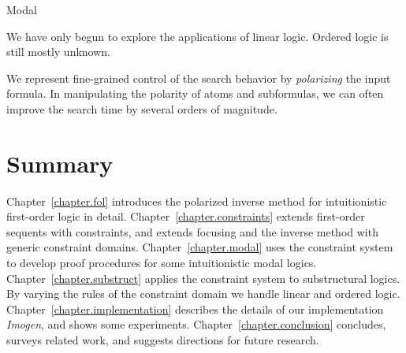 Modal

We have only begun to explore the applications of linear logic.  Ordered
logic is still mostly unknown.


We represent fine-grained control of the search behavior
by \emph{polarizing} the input formula.
In manipulating the polarity of atoms and subformulas, we can
often improve the search time by several orders of magnitude.


\section{Summary}

Chapter~\ref{chapter.fol} introduces the polarized inverse method for
intuitionistic first-order logic in detail.  Chapter~\ref{chapter.constraints}
extends first-order sequents with constraints, and extends focusing and
the inverse method with generic constraint domains.  Chapter~\ref{chapter.modal}
uses the constraint system to develop proof procedures for some intuitionistic
modal logics.  Chapter~\ref{chapter.substruct} applies the constraint system
to substructural logics.  By varying the rules of the constraint domain we
handle linear and ordered logic.  Chapter~\ref{chapter.implementation} describes
the details of our implementation \emph{Imogen}, and shows some experiments.
Chapter~\ref{chapter.conclusion} concludes, surveys related work, and suggests
directions for future research.

